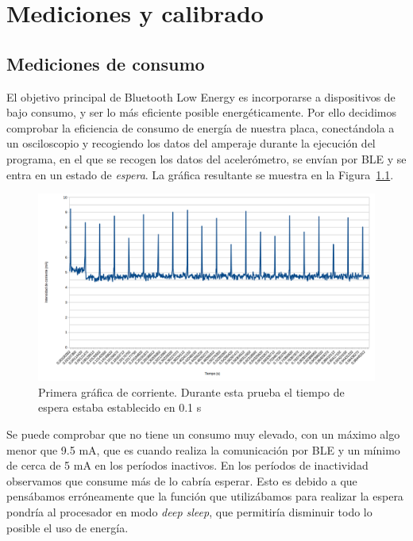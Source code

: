 \cleardoublepage

\chapter{Mediciones y calibrado}
\label{makereference7}

\section{Mediciones de consumo}

El objetivo principal de Bluetooth Low Energy es incorporarse a dispositivos de bajo consumo, y ser lo más eficiente posible energéticamente. Por ello decidimos comprobar la eficiencia de consumo de energía de nuestra placa, conectándola a un osciloscopio y recogiendo los datos del amperaje durante la ejecución del programa, en el que se recogen los datos del acelerómetro, se envían por BLE y se entra en un estado de \textit{espera}. La gráfica resultante se muestra en la Figura~\ref{figuraConsumoMayo}.

\begin{figure}[h]%
	\centering
    \includegraphics[width=\textwidth]{figures/consumo_mayo2.png}
    \caption[Primera gráfica de corriente]{Primera gráfica de corriente. Durante esta prueba el tiempo de espera estaba establecido en 0.1 s}
   	\label{figuraConsumoMayo}
\end{figure}

Se puede comprobar que no tiene un consumo muy elevado, con un máximo algo menor que 9.5 mA, que es cuando realiza la comunicación por BLE y un mínimo de cerca de 5 mA en los períodos inactivos. En los períodos de inactividad observamos que consume más de lo cabría esperar. Esto es debido a que pensábamos erróneamente que la función que utilizábamos para realizar la espera pondría al procesador en modo \textit{deep sleep}, que permitiría disminuir todo lo posible el uso de energía.

